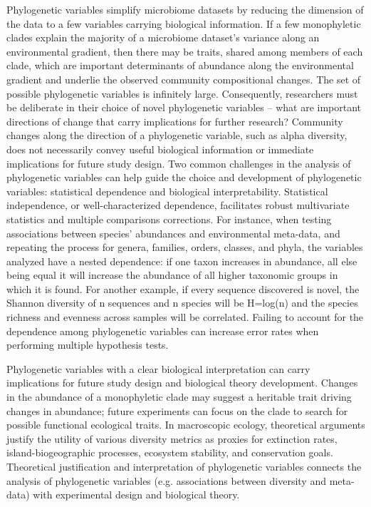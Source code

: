 Phylogenetic variables simplify microbiome datasets by reducing the dimension of the data to a few variables carrying biological information. If a few monophyletic clades explain the majority of a microbiome dataset's variance along an environmental gradient, then there may be traits, shared among members of each clade, which are important determinants of abundance along the environmental gradient and underlie the observed community compositional changes.
The set of possible phylogenetic variables is infinitely large. Consequently, researchers must be deliberate in their choice of novel phylogenetic variables – what are important directions of change that carry implications for further research? Community changes along the direction of a phylogenetic variable, such as alpha diversity, does not necessarily convey useful biological information or immediate implications for future study design. Two common challenges in the analysis of phylogenetic variables can help guide the choice and development of phylogenetic variables: statistical dependence and biological interpretability.
Statistical independence, or well-characterized dependence, facilitates robust multivariate statistics and multiple comparisons corrections. For instance, when testing associations between species' abundances and environmental meta-data, and repeating the process for genera, families, orders, classes, and phyla, the variables analyzed have a nested dependence: if one taxon increases in abundance, all else being equal it will increase the abundance of all higher taxonomic groups in which it is found. For another example, if every sequence discovered is novel, the Shannon diversity of n sequences and n species will be H=log(n) and the species richness and evenness across samples will be correlated. Failing to account for the dependence among phylogenetic variables can increase error rates when performing multiple hypothesis tests.\par
Phylogenetic variables with a clear biological interpretation can carry implications for future study design and biological theory development. Changes in the abundance of a monophyletic clade may suggest a heritable trait driving changes in abundance; future experiments can focus on the clade to search for possible functional ecological traits. In macroscopic ecology, theoretical arguments justify the utility of various diversity metrics as proxies for extinction rates, island-biogeographic processes, ecosystem stability, and conservation goals\cite{socolar_prey,socolar_beta_diversity,mccann_diversity}.  Theoretical justification and interpretation of phylogenetic variables connects the analysis of phylogenetic variables (e.g. associations between diversity and meta-data) with experimental design and biological theory.\par
